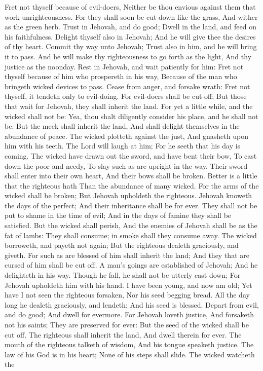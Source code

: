Fret not thyself because of evil-doers, Neither be thou envious against them that work unrighteousness.  For they shall soon be cut down like the grass, And wither as the green herb.  Trust in Jehovah, and do good; Dwell in the land, and feed on his faithfulness.  Delight thyself also in Jehovah; And he will give thee the desires of thy heart.  Commit thy way unto Jehovah; Trust also in him, and he will bring it to pass.  And he will make thy righteousness to go forth as the light, And thy justice as the noonday.  Rest in Jehovah, and wait patiently for him: Fret not thyself because of him who prospereth in his way, Because of the man who bringeth wicked devices to pass.  Cease from anger, and forsake wrath: Fret not thyself, it tendeth only to evil-doing.  For evil-doers shall be cut off; But those that wait for Jehovah, they shall inherit the land.  For yet a little while, and the wicked shall not be: Yea, thou shalt diligently consider his place, and he shall not be.  But the meek shall inherit the land, And shall delight themselves in the abundance of peace.  The wicked plotteth against the just, And gnasheth upon him with his teeth.  The Lord will laugh at him; For he seeth that his day is coming.  The wicked have drawn out the sword, and have bent their bow, To cast down the poor and needy, To slay such as are upright in the way.  Their sword shall enter into their own heart, And their bows shall be broken.  Better is a little that the righteous hath Than the abundance of many wicked.  For the arms of the wicked shall be broken; But Jehovah upholdeth the righteous.  Jehovah knoweth the days of the perfect; And their inheritance shall be for ever.  They shall not be put to shame in the time of evil; And in the days of famine they shall be satisfied.  But the wicked shall perish, And the enemies of Jehovah shall be as the fat of lambs: They shall consume; in smoke shall they consume away.  The wicked borroweth, and payeth not again; But the righteous dealeth graciously, and giveth.  For such as are blessed of him shall inherit the land; And they that are cursed of him shall be cut off.  A man’s goings are established of Jehovah; And he delighteth in his way.  Though he fall, he shall not be utterly cast down; For Jehovah upholdeth him with his hand.  I have been young, and now am old; Yet have I not seen the righteous forsaken, Nor his seed begging bread.  All the day long he dealeth graciously, and lendeth; And his seed is blessed.  Depart from evil, and do good; And dwell for evermore.  For Jehovah loveth justice, And forsaketh not his saints; They are preserved for ever: But the seed of the wicked shall be cut off.  The righteous shall inherit the land, And dwell therein for ever.  The mouth of the righteous talketh of wisdom, And his tongue speaketh justice.  The law of his God is in his heart; None of his steps shall slide.  The wicked watcheth the 